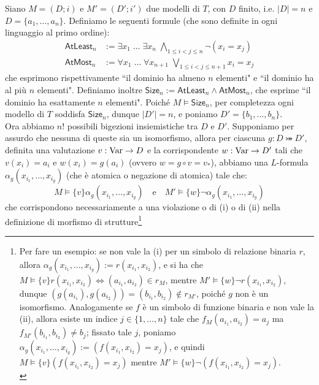 \begin{soln}
    Siano $M = (D;i)$ e $M' = (D';i')$ due modelli di $T$, con $D$ finito, i.e. $|D| = n$ e $D = \{a_1,\ldots,a_n\}$. Definiamo le seguenti formule (che sono definite in ogni linguaggio al primo ordine):
    \begin{align*}
        \mathsf{AtLeast}_n &:= \exists x_1 \; \ldots \; \exists x_n \; \bigwedge_{1 \le i < j \le n} \neg(x_i = x_j) \\
        \mathsf{AtMost}_n &:= \forall x_1 \; \ldots \; \forall x_{n+1} \; \bigvee_{1 \le i < j \le n+1} x_i = x_j
    \end{align*}
    che esprimono rispettivamente ``il dominio ha almeno $n$ elementi" e ``il dominio ha al più $n$ elementi". Definiamo inoltre $\mathsf{Size}_n := \mathsf{AtLeast}_n \land \mathsf{AtMost}_n$, che esprime ``il dominio ha esattamente $n$ elementi".
    Poiché $M \models \mathsf{Size}_n$, per completezza ogni modello di $T$ soddisfa $\mathsf{Size}_n$, dunque $|D'| = n$, e poniamo $D' = \{b_1,\ldots,b_n\}$.\\
    Ora abbiamo $n!$ possibili bigezioni insiemistiche tra $D$ e $D'$. Supponiamo per assurdo che nessuna di queste sia un isomorfismo, allora per ciascuna $g : D \bij D'$, definita una valutazione $v : \operatorname{Var} \to D$ e la corrispondente $w : \operatorname{Var} \to D'$ tali che $v(x_i) = a_i$ e $w(x_i) = g(a_i)$ (ovvero $w = g \circ v = v_*$),
    abbiamo una $L$-formula $\alpha_g(x_{i_1},\ldots,x_{i_g})$ (che è atomica o negazione di atomica) tale che:
    \[ M \models\{v\} \alpha_g(x_{i_1},\ldots,x_{i_g}) \quad\text{e}\quad M' \models\{w\} \neg \alpha_g(x_{i_1},\ldots,x_{i_g}) 
    \]
    che corrispondono necessariamente a una violazione o di (i) o di (ii) nella definizione di morfismo di strutture\footnote{Per fare un esempio: se non vale la (i) per un simbolo di relazione binaria $r$, allora $\alpha_g(x_{i_1},\ldots,x_{i_g}) := r(x_{i_1},x_{i_2})$, e si ha che $M \models\{v\} r(x_{i_1},x_{i_2}) \iff (a_{i_1},a_{i_2}) \in r_M$, mentre $M' \models\{w\} \neg r(x_{i_1},x_{i_2})$, dunque $(g(a_{i_1}),g(a_{i_2})) = (b_{i_1},b_{i_2})\not \in r_{M'}$, poiché $g$ non è un isomorfismo.
    Analogamente se $f$ è un simbolo di funzione binaria e non vale la (ii), allora esiste un indice $j \in \{1,\ldots,n\}$ tale che $f_M(a_{i_1},a_{i_2}) = a_j$ ma $f_{M'}(b_{i_1},b_{i_2}) \ne b_j$; fissato tale $j$, poniamo $\alpha_g(x_{i_1},\ldots,x_{i_g}) := (f(x_{i_1},x_{i_2}) = x_j)$, e quindi $M \models\{v\} (f(x_{i_1},x_{i_2}) = x_j)$ mentre $M' \models\{w\} \neg (f(x_{i_1},x_{i_2}) = x_j)$.\\
}
\end{soln}
